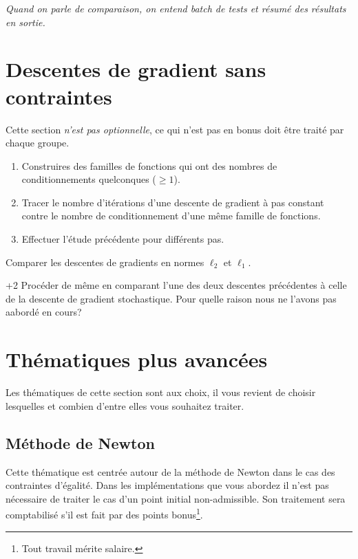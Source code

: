 \documentclass[11pt, a4paper]{article}
\begin{document}
\vspace{\baselineskip}
\noindent \emph{Quand on parle de comparaison, on entend batch de
  tests et résumé des résultats en sortie.}

\section{Descentes de gradient sans contraintes}

Cette section \emph{n'est pas optionnelle}, ce qui n'est pas en bonus
doit être traité par chaque groupe.

\begin{question}{6}
  \begin{enumerate}
  \item Construires des familles de fonctions qui ont des nombres de
    conditionnements quelconques ($\geq 1$).
  \item Tracer le nombre d'itérations d'une descente de gradient à pas
    constant contre le nombre de conditionnement d'une même famille de
    fonctions.
  \item Effectuer l'étude précédente pour différents pas.
  \end{enumerate}
\end{question}

\begin{question}{2}
  Comparer les descentes de gradients en normes $\ell_2$ et $\ell_1$.
\end{question}

\begin{question}{+2}
  Procéder de même en comparant l'une des deux descentes précédentes à
  celle de la descente de gradient stochastique. Pour quelle raison
  nous ne l'avons pas aabordé en cours?
\end{question}

\section{Thématiques plus avancées}

Les thématiques de cette section sont aux choix, il vous revient de
choisir lesquelles et combien d'entre elles vous souhaitez traiter.

\subsection{Méthode de Newton}

Cette thématique est centrée autour de la méthode de Newton dans le
cas des contraintes d'égalité. Dans les implémentations que vous
abordez il n'est pas nécessaire de traiter le cas d'un point initial
non-admissible. Son traitement sera comptabilisé s'il est fait par des
points bonus\footnote{Tout travail mérite salaire.}.
\end{document}
